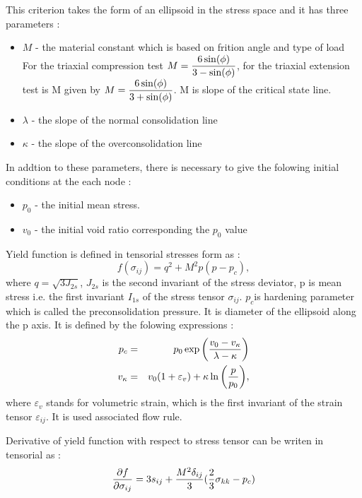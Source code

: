 This criterion takes the form of an ellipsoid in the stress space and it has 
three parameters :
\begin {itemize}
\item $M$ - the material constant which is based on frition angle and type of load
For the triaxial compression test $M = \mbox{$\displaystyle\frac{6\sin(\phi)}{3-\sin(\phi)}$}$, for the triaxial 
extension test is M given by $M = \mbox{$\displaystyle\frac{6\sin(\phi)}{3+\sin(\phi)}$}$. M is slope of the critical
state line.
\item $\lambda$ - the slope of the normal consolidation line
\item $\kappa$ - the slope of the overconsolidation line
\end {itemize}
In addtion to these parameters, there is necessary to give the folowing initial conditions
at the each node :
\begin {itemize}
\item $p_0$ - the initial mean stress.
\item $v_0$ - the initial void ratio corresponding the $p_0$ value
\end {itemize}

Yield function is defined in tensorial stresses form as :
\begin{equation}
f(\sigma_{ij}) = q^2 + M^2p (p-p_c),
\end{equation}
where $q = \sqrt{3J_{2s}}$, $J_{2s}$ is the second invariant of the stress deviator,
p is mean stress i.e. the first invariant $I_{1s}$ of the stress tensor $\sigma_{ij}$.
$p_c$is hardening parameter which is called the preconsolidation pressure. It is
diameter of the ellipsoid along the p axis. It is defined by the folowing expressions :
\begin {eqnarray}
p_c &=& p_0 \exp{\left(\mbox{$\displaystyle\frac{v_0-v_\kappa}{\lambda-\kappa}$}\right)}\\
v_\kappa &=& v_0 (1+\varepsilon_v)+\kappa \ln {\left(\mbox{$\displaystyle\frac{p}{p_0}$}\right)},
\end{eqnarray}
where $\varepsilon_v$ stands for volumetric strain, which is the first invariant
of the strain tensor $\varepsilon_{ij}$. It is used associated flow rule.

Derivative of yield function with respect to stress tensor can be writen in tensorial as :
\begin{equation}
\mbox{$\displaystyle\frac{\partial{f}}{\partial{\sigma_{ij}}}$} = 3s_{ij} + \frac{M^2\delta_{ij}}{3}(\frac{2}{3}\sigma_{kk}-p_c)
\end{equation}

